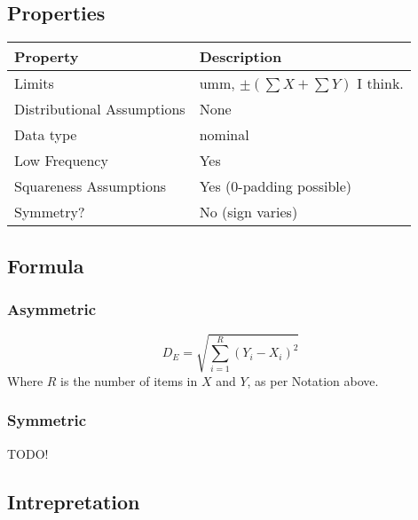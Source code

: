 \documentclass[11pt]{article}
\begin{document}
\subsection{Properties}
\begin{tabular}{| l || l |}
    \hline
    {\bf Property} & {\bf Description} \\
    \hline
    Limits & umm, $\pm (\sum{X} + \sum{Y}) $ I think. \\ \hline

    Distributional Assumptions& None \\ \hline

    Data type & nominal \\ \hline

    Low Frequency & Yes \\ \hline

    Squareness Assumptions & Yes (0-padding possible) \\ \hline
    
    Symmetry? & No (sign varies) \\ \hline

\end{tabular}


\subsection{Formula}

\subsubsection{Asymmetric}
$$
D_E = \sqrt{ \sum_{i=1}^{R}{ (Y_i - X_i)^2 } }
$$
Where $R$ is the number of items in $X$ and $Y$, as per Notation above.

\subsubsection{Symmetric}
 TODO!

\subsection{Intrepretation}
\end{document}
